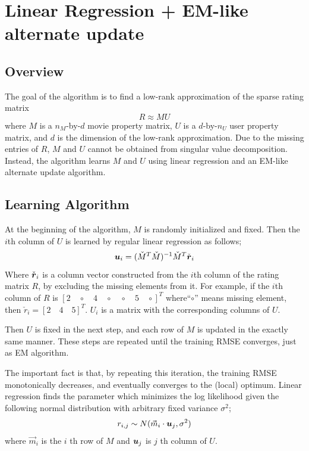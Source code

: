 \documentclass{article}
\begin{document}
\fi

\section{Linear Regression + EM-like alternate update}
\subsection{Overview}
The goal of the algorithm is to find a low-rank approximation of the sparse rating matrix
\begin{equation}
R \approx MU
\end{equation}
where $M$ is a $n_M$-by-$d$ movie property matrix, $U$ is a
$d$-by-$n_U$ user property matrix, and $d$ is the dimension of the
low-rank approximation. Due to the missing entries of $R$, $M$ and $U$
cannot be obtained from singular value decomposition. Instead, the
algorithm learns $M$ and $U$ using linear regression and an EM-like
alternate update algorithm.

\subsection{Learning Algorithm}

At the beginning of the algorithm, $M$ is randomly initialized and fixed. Then the $i$th column of $U$ is learned by regular linear regression as follows;
\begin{equation}
{ \mbox{\boldmath $u$} }_i=(\check{M}^T\check{M})^{-1}\check{M}^T \check{{ \mbox{\boldmath $r$} }}_i
\end{equation}
Where $\check{{ \mbox{\boldmath $r$} }}_i$ is a column vector constructed from the $i$th column of the rating matrix $R$, by excluding the missing elements from it. For example, if the $i$th column of $R$ is $[2 \quad \circ \quad 4 \quad \circ \quad \circ \quad 5 \quad \circ]^T$ where``$\circ$'' means missing element, then $\check{r}_i = [2 \quad 4 \quad 5]^T$. $U_i$ is a matrix with the corresponding columns of $U$.

Then $U$ is fixed in the next step, and each row of $M$ is updated in the exactly same manner. These steps are repeated until the training RMSE converges, just as EM algorithm. 

The important fact is that, by repeating this iteration, the training RMSE monotonically decreases, and eventually converges to the (local) optimum. Linear regression finds the parameter which minimizes the log likelihood given the following normal distribution with arbitrary fixed variance $\sigma^2$;
\begin{equation}
r_{i,j}\sim N(\vec{m}_i \cdot {{ \mbox{\boldmath $u$} }}_j, \sigma^2)
\end{equation}
where $\vec{m}_i$ is the $i$ th row of $M$ and ${{ \mbox{\boldmath $u$} }}_j$ is $j$ th column of $U$.
\end{document}
